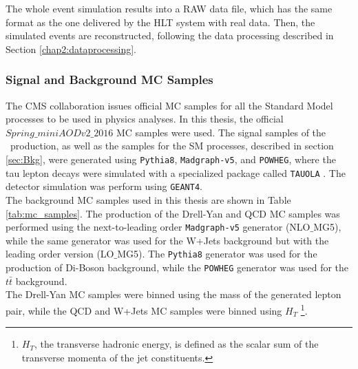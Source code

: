 \noindent The whole event simulation results into a RAW data file, which has the same 
format as the one delivered by the HLT system with real 
data. Then, the simulated events are reconstructed, following the data processing 
described in Section \ref{chap2:dataprocessing}. \\

\subsubsection{Signal and Background MC Samples}
\label{subsubsec:MCSamples}

\noindent The CMS collaboration issues official MC samples for all the 
Standard Model processes to be used in physics analyses. In this thesis, the official 
$Spring\_miniAODv2\_2016$ MC samples were used. The signal samples of 
the \Zprime~production, as well as the samples for the SM processes, described in section \ref{sec:Bkg},
were generated  using \texttt{Pythia8}, \texttt{Madgraph-v5}, and \texttt{POWHEG}, where 
the tau lepton decays were simulated with a specialized package called \texttt{TAUOLA} \cite{bib:tauola}.
The detector simulation was perform using \texttt{GEANT4}. \\

\noindent The background MC samples used in this thesis are shown in Table \ref{tab:mc_samples}. The 
production of the Drell-Yan and QCD MC samples was performed using the next-to-leading order
\texttt{Madgraph-v5} generator (NLO$\_$MG5), while the same generator was used 
for the W+Jets background but with the leading order version (LO$\_$MG5). The 
\texttt{Pythia8} generator was used for the production of Di-Boson background, while 
the \texttt{POWHEG} generator was used for the $t\bar{t}$ background. \\

The Drell-Yan MC samples were binned using the mass of the generated lepton pair, while the QCD and W+Jets MC samples 
were binned using $H_{T}$ \footnote{$H_{T}$, the transverse hadronic energy, is defined as the scalar sum of the
transverse momenta of the jet constituents.}.\\


